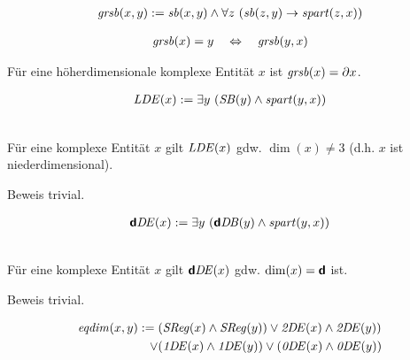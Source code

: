 \begin{erin}
    \begin{align*}
        \mathit{gr\hspace*{-0.25ex}sb}(x,y) := \mathit{sb}(x,y) \wedge \forall z\ (\mathit{sb}(z,y) \to \mathit{spart}(z,x))
    \end{align*}
\end{erin}

\begin{erin}
    \begin{align*}
        \mathit{gr\hspace*{-0.25ex}sb}(x) = y \quad \Leftrightarrow \quad \mathit{gr\hspace*{-0.25ex}sb}(y,x)
    \end{align*}
\end{erin}

\begin{hyp}
    Für eine höherdimensionale komplexe Entität $x$ ist $\mathit{gr\hspace*{-0.25ex}sb}(x) = \partial x$.
\end{hyp}

 
\begin{erin}
    \begin{align*}
        \mathit{LDE}(x) := \exists y\ (\mathit{S\hspace*{-0.25ex}B}(y) \wedge \mathit{spart}(y, x))
    \end{align*}
\end{erin}

\begin{satz}\ \\
    Für eine komplexe Entität $x$ gilt $\mathit{LDE}(x)$ gdw. $\dim(x) \neq 3$ (d.h. $x$ ist niederdimensional).
\end{satz}
Beweis trivial.


\begin{erin}
    \begin{align*}
        \mathit{\boldsymbol{\mathsf{d}}D\hspace*{-0.25ex} E}(x) := \exists y\ (\mathit{\boldsymbol{\mathsf{d}}D\hspace*{-0.25ex} B}(y) \wedge \mathit{spart}(y, x))
    \end{align*}
\end{erin}

\begin{satz}\ \\
    Für eine komplexe Entität $x$ gilt $\mathit{\boldsymbol{\mathsf{d}}D\hspace*{-0.25ex} E}(x)$ gdw. $\dim(x) = \boldsymbol{\mathsf{d}}$ ist.
\end{satz}
Beweis trivial.


\begin{erin}
    \begin{align*}
        \mathit{eqdim}(x,y) := (&\mathit{S\hspace*{-0.25ex}Reg}(x) \wedge \mathit{S\hspace*{-0.25ex}Reg}(y)) \vee \mathit{2D\hspace*{-0.25ex} E}(x) \wedge \mathit{2D\hspace*{-0.25ex} E}(y))\\ \vee (&\mathit{1D\hspace*{-0.25ex} E}(x) \wedge \mathit{1D\hspace*{-0.25ex} E}(y)) \vee (\mathit{0D\hspace*{-0.25ex} E}(x) \wedge \mathit{0D\hspace*{-0.25ex} E}(y))
    \end{align*}
\end{erin}

